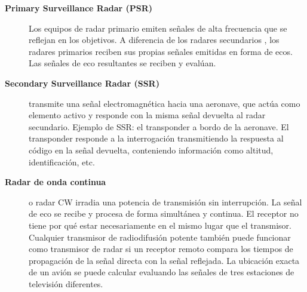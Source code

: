
\begin{description}
\item[\bf Primary Surveillance Radar (PSR)]

  Los equipos de radar primario emiten señales de alta frecuencia que se reflejan en los objetivos. A diferencia de los radares secundarios , los radares primarios reciben sus propias señales emitidas en forma de ecos. Las señales de eco resultantes se reciben y evalúan.



  

\item[\bf Secondary Surveillance Radar (SSR)] transmite una señal electromagnética hacia una aeronave, que actúa como elemento activo y responde con la misma señal devuelta al radar secundario.
  Ejemplo de SSR: el transponder a bordo de la aeronave. El transponder responde a la interrogación transmitiendo la respuesta al código en la señal devuelta, conteniendo información como altitud, identificación,  etc.

\item [\bf Radar de onda continua]  o radar CW irradia una potencia de transmisión sin interrupción. La señal de eco se recibe y procesa de forma simultánea y continua. El receptor no tiene por qué estar necesariamente en el mismo lugar que el transmisor. Cualquier transmisor de radiodifusión potente también puede funcionar como transmisor de radar si un receptor remoto compara los tiempos de propagación de la señal directa con la señal reflejada. La ubicación exacta de un avión se puede calcular evaluando las señales de tres estaciones de televisión diferentes.


\end{description}

